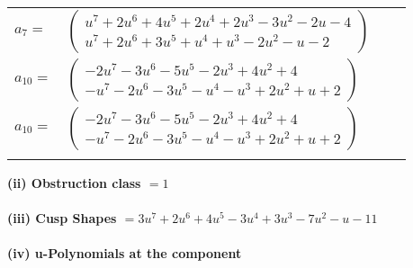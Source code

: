 \documentclass[1p]{elsarticle_modified}
\theoremstyle{definition}
\begin{document}
\begin{tabular}{m{7pt} m{180pt} m{7pt} m{180pt} }
\flushright $a_{7}=$&$\begin{pmatrix}u^7+2 u^6+4 u^5+2 u^4+2 u^3-3 u^2-2 u-4\\u^7+2 u^6+3 u^5+u^4+u^3-2 u^2- u-2\end{pmatrix}$ \\
\flushright $a_{10}=$&$\begin{pmatrix}-2 u^7-3 u^6-5 u^5-2 u^3+4 u^2+4\\- u^7-2 u^6-3 u^5- u^4- u^3+2 u^2+u+2\end{pmatrix}$\\ \flushright $a_{10}=$&$\begin{pmatrix}-2 u^7-3 u^6-5 u^5-2 u^3+4 u^2+4\\- u^7-2 u^6-3 u^5- u^4- u^3+2 u^2+u+2\end{pmatrix}$\\&\end{tabular}
\flushleft \textbf{(ii) Obstruction class $= 1$}\\~\\
\flushleft \textbf{(iii) Cusp Shapes $= 3 u^7+2 u^6+4 u^5-3 u^4+3 u^3-7 u^2- u-11$}\\~\\
\newpage\renewcommand{\arraystretch}{1}
\flushleft \textbf{(iv) u-Polynomials at the component}\newline \\
\end{document}
